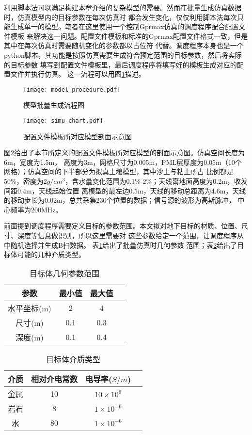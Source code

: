 利用脚本法可以满足构建本章介绍的复杂模型的需要。然而在批量生成仿真数据时，仿真模型内的目标参数在每次仿真时
都会发生变化，仅仅利用脚本法每次只能生成单一的模型。笔者在这里使用一个控制Gprmax仿真的调度程序配合配置文件模板
来解决这一问题。配置文件模板和标准的Gprmax配置文件格式一致，但是其中在每次仿真时需要随机变化的参数都以占位符
代替。调度程序本身也是一个python脚本，其功能是按照仿真需要生成符合预定范围的目标参数，然后将实际的目标参数
填写到配置文件模板里，最后调度程序将填写好的模板生成对应的配置文件并执行仿真。
这一流程可以用图\ref{gprmax_batch_model_procedure}描述。
\begin{figure}[htbp]
	\texttt{[image: model\_procedure.pdf]}
	\caption[]{模型批量生成流程图}
	\label{gprmax_batch_model_procedure}
\end{figure}
\begin{figure}[htbp]
	\texttt{[image: simu\_chart.pdf]}
	\caption[]{配置文件模板所对应模型剖面示意图}
	\label{simulation_chart}
\end{figure}

图\ref{simulation_chart}给出了本节所定义的配置文件模板所对应模型的剖面示意图。仿真空间长度为6m，宽度为1.5m，
高度为3m，网格尺寸为0.005m，PML层厚度为0.05m（10个网格）；仿真空间的下半部分为拟真土壤模型，其中沙土与粘土所占
比例都是50\%，密度为$2g/cm^3$，含水量变化范围为0.1\%-2\%；天线离地面高度为0.2m，收发间距0.4m，天线起始位置
离模型的最左边0.5m，天线的移动总距离为4.6m，天线的移动步长为0.02m，总共采集230个位置的数据；信号源的波形为高斯脉冲，
中心频率为200MHz。

前面提到调度程序需要定义目标的参数范围。本文拟对地下目标的材质、位置、尺寸、深度等信息做识别，所以这里需要对
这些参数给定一个范围，让调度程序从中随机选择并生成B扫数据。
表\ref{table_geometry}给出了批量仿真时几何参数
范围；表\ref{table_material}给出了目标体可能的几种介质类型。
\begin{table}[h]
	\caption{目标体几何参数范围} 
	\begin{tabular}{|c|c|c|c|} 
		\hline  
		参数 &  最小值 & 最大值 \\
		\hline 
		水平坐标(m) & 2 & 4 \\  
		\hline  
		尺寸(m) & 0.1 & 0.3 \\  
		\hline  
		深度(m) & 0.1 & 0.4 \\  
		\hline  
	\end{tabular}
	\label{table_geometry}
\end{table}

\begin{table}[h]
	\caption{目标体介质类型} 
	\begin{tabular}{|c|c|c|c|} 
		\hline  
		介质 &  相对介电常数 & 电导率($S/m$)\\
		\hline 
		金属 & 10 & $10\times10^6$ \\  
		\hline  
		岩石 & 8 & $1\times10^{-6}$ \\  
		\hline  
		水 & 80 & $1\times10^{-6}$ \\  
		\hline  
	\end{tabular}
	\label{table_material}
\end{table}


